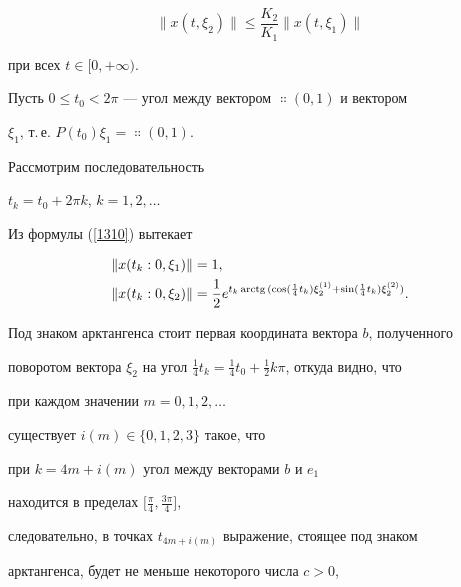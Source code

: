 \begin{equation}


\label{139}


\|x(t,\xi_{2})\|\leq \frac{K_{2}}{K_{1}}\|x(t,\xi_{1})\|


\end{equation}


при всех $t\in [0,+\infty)$.





Пусть $0\leq t_{0}<2\pi$ --- угол между вектором $\Colon(0,1)$ и вектором


$\xi_{1}$, т.\,е. $P(t_{0})\xi_{1}=\Colon(0,1)$.


Рассмотрим последовательность


$t_{k}=t_{0}+2\pi k$, $k=1,2,\dotsc$


Из формулы (\ref{1310}) вытекает


\begin{equation}


\label{1311}


\begin{split}


\|x(t_{k}:0,\xi_{1})\|&=1, \\


\|x(t_{k}:0,\xi_{2})\|&=


\frac{1}{2}e^{t_{k}\arctg{(\cos(\frac{1}{4}t_{k})\xi_{2}^{(1)}+


\sin(\frac{1}{4}t_{k})\xi_{2}^{(2)})}}.


\end{split}


\end{equation}


Под знаком арктангенса стоит первая координата вектора $b$, полученного


поворотом вектора $\xi_{2}$ на угол $\frac{1}{4}t_{k}=


\frac{1}{4}t_{0}+\frac{1}{2}k\pi$, откуда видно, что


при каждом значении $m=0,1,2,\dotsc$


существует $i(m)\in \{0,1,2,3\}$ такое, что


при $k=4m+i(m)$ угол между векторами $b$ и $e_{1}$


находится в пределах $\big[\frac{\pi}{4},\frac{3\pi}{4}\big]$,


следовательно, в точках $t_{4m+i(m)}$ выражение, стоящее под знаком


арктангенса, будет не меньше некоторого числа $c>0$,


